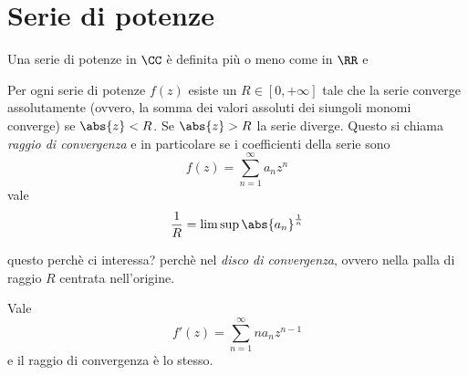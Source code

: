 \documentclass[11pt]{scrartcl}
\begin{document}
	\section{Serie di potenze}
	Una serie di potenze in $\CC$ è definita più o meno come in $\RR$ e 
	\begin{theorem}
		Per ogni serie di potenze $f(z)$ esiste un $R\in [0,+\infty]$ tale che la serie converge assolutamente (ovvero, la somma dei valori assoluti dei siungoli monomi converge) se $\abs{z}<R$. Se $\abs{z}>R$ la serie diverge. Questo si chiama \textit{raggio di convergenza} e in particolare se i coefficienti della serie sono
		$$f(z)=\sum_{n=1}^\infty a_n z^n$$
		vale 
		$$\frac{1}{R}=\limsup \abs{a_n}^{\frac{1}{n}}$$
	\end{theorem}
	questo perchè ci interessa? perchè nel \textit{disco di convergenza}, ovvero nella palla di raggio $R$ centrata nell'origine.
	\begin{lemma}
		Vale 
		$$f'(z)=\sum_{n=1}^\infty na_nz^{n-1}$$
		e  il raggio di convergenza è lo stesso.
	\end{lemma}
\end{document}
